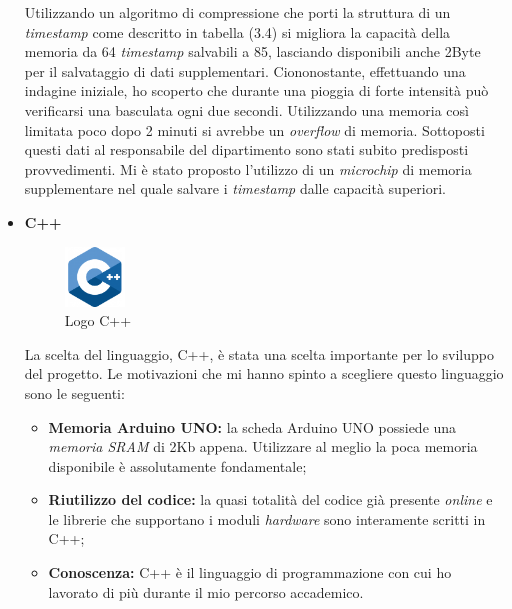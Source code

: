 \begin{itemize}
Utilizzando un algoritmo di compressione che porti la struttura di un \textit{timestamp} come descritto in tabella (3.4) si migliora la capacità della memoria da 64 \textit{timestamp} salvabili a 85, lasciando disponibili anche 2Byte per il salvataggio di dati supplementari. Ciononostante, effettuando una indagine iniziale, ho scoperto che durante una pioggia di forte intensità può verificarsi una basculata ogni due secondi. Utilizzando una memoria così limitata poco dopo 2 minuti si avrebbe un \textit{overflow} di memoria. Sottoposti questi dati al responsabile del dipartimento sono stati subito predisposti provvedimenti. Mi è stato proposto l'utilizzo di un \textit{microchip} di memoria supplementare nel quale salvare i \textit{timestamp} dalle capacità superiori.  

\item \textbf{C++}\\

\begin{figure}[htbp]
\centering
\includegraphics[width=0.15\textwidth]{./capitoli/capitolo3/img/c}
\caption{Logo C++}
\end{figure}

La scelta del linguaggio, C++, è stata una scelta importante per lo sviluppo del progetto. Le motivazioni che mi hanno spinto a scegliere questo linguaggio sono le seguenti:

\begin{itemize}
\item \textbf{Memoria Arduino UNO:} la scheda Arduino UNO possiede una \textit{memoria SRAM} di 2Kb appena. Utilizzare al meglio la poca memoria disponibile è assolutamente fondamentale;
\item \textbf{Riutilizzo del codice:} la quasi totalità del codice già presente \textit{online} e le librerie che supportano i moduli \textit{hardware} sono interamente scritti in C++;
\item \textbf{Conoscenza:} C++ è il linguaggio di programmazione con cui ho lavorato di più durante il mio percorso accademico.
\end{itemize}


\end{itemize}
